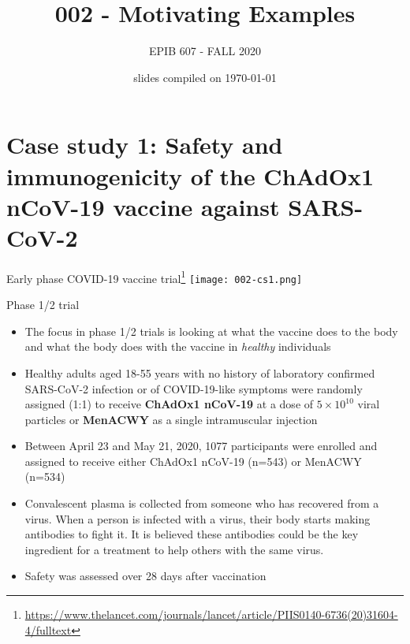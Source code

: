 \documentclass{beamer}\usepackage[]{graphicx}\usepackage[]{color}
\begin{document}
	
	
	
	
	\title{002 - Motivating Examples}
	\author{EPIB 607 - FALL 2020}
	
	\date{slides compiled on \today}
	
	\maketitle

\section{Case study 1: Safety and immunogenicity of the ChAdOx1 nCoV-19	vaccine against SARS-CoV-2}


\begin{frame}{Early phase COVID-19 vaccine trial\footnote{\scriptsize\url{https://www.thelancet.com/journals/lancet/article/PIIS0140-6736(20)31604-4/fulltext}}}
	\centering
	\texttt{[image: 002-cs1.png]}	
\end{frame}




\begin{frame}{Phase 1/2 trial}
	\begin{itemize}
		\item The focus in phase 1/2 trials is looking at what the vaccine does to the body and what the body does with the vaccine in \textit{healthy} individuals
		\item Healthy adults aged 18-55 years with no history of laboratory confirmed SARS-CoV-2 infection or of COVID-19-like symptoms were randomly assigned (1:1) to receive \textbf{ChAdOx1 nCoV-19} at a dose of $5\times 10^{10}$ viral particles or \textbf{MenACWY} as a single intramuscular injection
		\item Between April 23 and May 21, 2020, 1077 participants were enrolled and assigned to receive either ChAdOx1 nCoV-19 (n=543) or MenACWY (n=534)
		\item Convalescent plasma is collected from someone who has recovered from a virus. When a person is infected with a virus, their body starts making antibodies to fight it. It is believed these antibodies could be the key ingredient for a treatment to help others with the same virus.
		\item Safety was assessed over 28 days after vaccination
	\end{itemize}
\end{frame}
\end{document}
